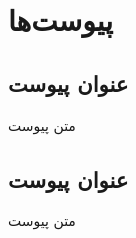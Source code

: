\chapter*{پیوست‌ها}
\renewcommand{\thesection}{\Alph{section}}

\section{عنوان پیوست}
متن پیوست
\section{عنوان پیوست}
متن پیوست
